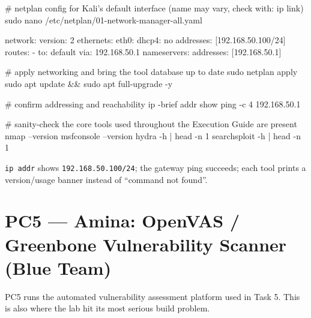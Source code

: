 \documentclass[11pt,a4paper]{article}
\begin{document}
\begin{cmdbox}
\begin{cmdverb}
# netplan config for Kali's default interface (name may vary, check with: ip link)
sudo nano /etc/netplan/01-network-manager-all.yaml
\end{cmdverb}
\end{cmdbox}

\begin{cmdbox}
\begin{cmdverb}
network:
  version: 2
  ethernets:
    eth0:
      dhcp4: no
      addresses: [192.168.50.100/24]
      routes:
        - to: default
          via: 192.168.50.1
      nameservers:
        addresses: [192.168.50.1]
\end{cmdverb}
\end{cmdbox}

\begin{cmdbox}
\begin{cmdverb}
# apply networking and bring the tool database up to date
sudo netplan apply
sudo apt update && sudo apt full-upgrade -y

# confirm addressing and reachability
ip -brief addr show
ping -c 4 192.168.50.1

# sanity-check the core tools used throughout the Execution Guide are present
nmap --version
msfconsole --version
hydra -h | head -n 1
searchsploit -h | head -n 1
\end{cmdverb}
\end{cmdbox}

\begin{expectbox}
\texttt{ip addr} shows \texttt{192.168.50.100/24}; the gateway ping succeeds; each
tool prints a version/usage banner instead of ``command not found''.
\end{expectbox}

\clearpage

\section{PC5 --- Amina: OpenVAS / Greenbone Vulnerability Scanner (Blue Team)}
\label{sec:pc5}

PC5 runs the automated vulnerability assessment platform used in Task 5. This is also
where the lab hit its most serious build problem.
\end{document}
